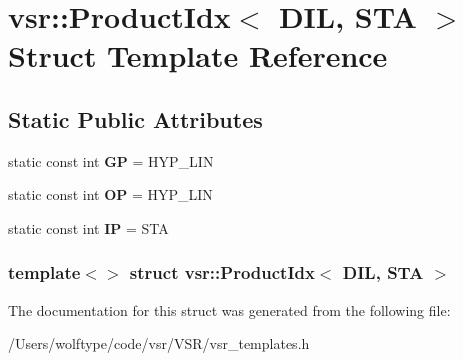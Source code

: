 \hypertarget{structvsr_1_1_product_idx_3_01_d_i_l_00_01_s_t_a_01_4}{\section{vsr\-:\-:Product\-Idx$<$ D\-I\-L, S\-T\-A $>$ Struct Template Reference}
\label{structvsr_1_1_product_idx_3_01_d_i_l_00_01_s_t_a_01_4}
}
\subsection*{Static Public Attributes}
\begin{DoxyCompactItemize}
\item 
\hypertarget{structvsr_1_1_product_idx_3_01_d_i_l_00_01_s_t_a_01_4_ae38b00f69aa28af07e907d3125ff8ba9}{static const int {\bfseries G\-P} = H\-Y\-P\-\_\-\-L\-I\-N}\label{structvsr_1_1_product_idx_3_01_d_i_l_00_01_s_t_a_01_4_ae38b00f69aa28af07e907d3125ff8ba9}

\item 
\hypertarget{structvsr_1_1_product_idx_3_01_d_i_l_00_01_s_t_a_01_4_a35b5703af5dd5159a972fee756511679}{static const int {\bfseries O\-P} = H\-Y\-P\-\_\-\-L\-I\-N}\label{structvsr_1_1_product_idx_3_01_d_i_l_00_01_s_t_a_01_4_a35b5703af5dd5159a972fee756511679}

\item 
\hypertarget{structvsr_1_1_product_idx_3_01_d_i_l_00_01_s_t_a_01_4_a9340f4c3403f66cc4ac0a6d0df2f89e2}{static const int {\bfseries I\-P} = S\-T\-A}\label{structvsr_1_1_product_idx_3_01_d_i_l_00_01_s_t_a_01_4_a9340f4c3403f66cc4ac0a6d0df2f89e2}

\end{DoxyCompactItemize}
\subsubsection*{template$<$$>$ struct vsr\-::\-Product\-Idx$<$ D\-I\-L, S\-T\-A $>$}



The documentation for this struct was generated from the following file\-:\begin{DoxyCompactItemize}
\item 
/\-Users/wolftype/code/vsr/\-V\-S\-R/vsr\-\_\-templates.\-h\end{DoxyCompactItemize}
